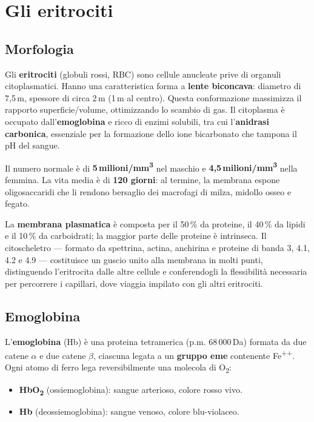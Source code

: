 \section{Gli eritrociti}

\subsection{Morfologia}

Gli \textbf{eritrociti} (globuli rossi, RBC) sono cellule anucleate prive di
organuli citoplasmatici. Hanno una caratteristica forma a \textbf{lente
biconcava}: diametro di 7,5\,\textmu m, spessore di circa 2\,\textmu m (1\,\textmu m
al centro). Questa conformazione massimizza il rapporto superficie/volume,
ottimizzando lo scambio di gas. Il citoplasma è occupato
dall'\textbf{emoglobina} e ricco di enzimi solubili, tra cui l'\textbf{anidrasi
carbonica}, essenziale per la formazione dello ione bicarbonato che tampona il
pH del sangue.

Il numero normale è di \textbf{5\,milioni/mm\textsuperscript{3}} nel maschio e
\textbf{4,5\,milioni/mm\textsuperscript{3}} nella femmina. La vita media è di
\textbf{120 giorni}: al termine, la membrana espone oligosaccaridi che li
rendono bersaglio dei macrofagi di milza, midollo osseo e fegato.

La \textbf{membrana plasmatica} è composta per il 50\,\% da proteine, il
40\,\% da lipidi e il 10\,\% da carboidrati; la maggior parte delle proteine è
intrinseca. Il citoscheletro — formato da spettrina, actina, anchirina e
proteine di banda 3, 4.1, 4.2 e 4.9 — costituisce un guscio unito alla
membrana in molti punti, distinguendo l'eritrocita dalle altre cellule e
conferendogli la flessibilità necessaria per percorrere i capillari,
dove viaggia impilato con gli altri eritrociti.

\subsection{Emoglobina}

L'\textbf{emoglobina} (Hb) è una proteina tetramerica (p.m. 68\,000\,Da)
formata da due catene $\alpha$ e due catene $\beta$, ciascuna legata a un
\textbf{gruppo eme} contenente Fe\textsuperscript{++}. Ogni atomo di ferro lega
reversibilmente una molecola di O\textsubscript{2}:

\begin{itemize}
  \item \textbf{HbO\textsubscript{2}} (ossiemoglobina): sangue arterioso,
    colore rosso vivo.
  \item \textbf{Hb} (deossiemoglobina): sangue venoso, colore blu-violaceo.
\end{itemize}

